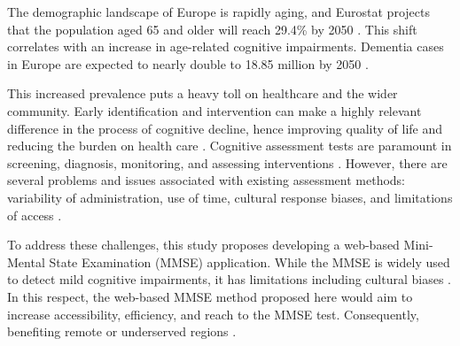 The demographic landscape of Europe is rapidly aging, and Eurostat projects that the population aged 65 and older will reach 29.4\% by 2050 \cite{Eurostat2020}. This shift correlates with an increase in age-related cognitive impairments. Dementia cases in Europe are expected to nearly double to 18.85 million by 2050 \cite{AlzheimerEurope2019}.

This increased prevalence puts a heavy toll on healthcare and the wider community. Early identification and intervention can make a highly relevant difference in the process of cognitive decline, hence improving quality of life and reducing the burden on health care \cite{Livingston2020}. Cognitive assessment tests are paramount in screening, diagnosis, monitoring, and assessing interventions \cite{Cullen2007, Petersen2018}. However, there are several problems and issues associated with existing assessment methods: variability of administration, use of time, cultural response biases, and limitations of access \cite{Prince2013, Cordell2013, Henrich2010, Goldberg2015, Geddes2020, Bilder2020}. 

To address these challenges, this study proposes developing a web-based Mini-Mental State Examination (MMSE) application. While the MMSE is widely used to detect mild cognitive impairments, it has limitations including cultural biases \cite{Folstein1975, Tombaugh1992}. In this respect, the web-based MMSE method proposed here would aim to increase accessibility, efficiency, and reach to the MMSE test. Consequently, benefiting remote or underserved regions \cite{Bauer2012, Zygouris2017, Seifan2015}.

